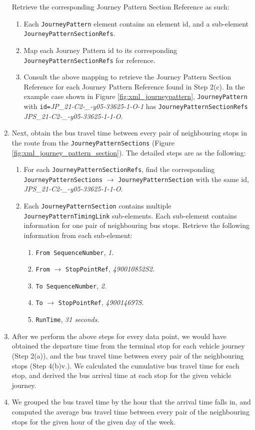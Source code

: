 \begin{enumerate}
  Retrieve the corresponding Journey Pattern Section Reference as such:
    \begin{enumerate}
      \item Each \texttt{JourneyPattern} element contains an element id, and a sub-element \texttt{JourneyPatternSectionRefs}.
      \item Map each Journey Pattern id to its corresponding \\ \texttt{JourneyPatternSectionRefs} for reference.
      \item Consult the above mapping to retrieve the Journey Pattern Section Reference for each Journey Pattern Reference found in Step 2(c). In the example case shown in Figure \ref{fig:xml_journeypattern}, \texttt{JourneyPattern} with \texttt{id=}\textit{JP\_21-C2-\_-y05-33625-1-O-1} has \texttt{JourneyPatternSectionRefs} \textit{JPS\_21-C2-\_-y05-33625-1-1-O}.
    \end{enumerate}
    \item Next, obtain the bus travel time between every pair of neighbouring stops in the route from the \texttt{JourneyPatternSections} (Figure \ref{fig:xml_journey_pattern_section}). The detailed steps are as the following:
    \begin{enumerate}
      \item For each \texttt{JourneyPatternSectionRefs}, find the corresponding \texttt{JourneyPatternSections} $\rightarrow$ \texttt{JourneyPatternSection} with the same id, \textit{JPS\_21-C2-\_-y05-33625-1-1-O}.
      \item Each \texttt{JourneyPatternSection} contains multiple \\ \texttt{JourneyPatternTimingLink} sub-elements. Each sub-element contains information for one pair of neighbouring bus stops. Retrieve the following information from each sub-element:
      \begin{enumerate}
        \item \texttt{From SequenceNumber}, \textit{1}.
        \item \texttt{From} $\rightarrow$ \texttt{StopPointRef}, \textit{490010852S2}.
        \item \texttt{To SequenceNumber}, \textit{2}.
        \item \texttt{To} $\rightarrow$ \texttt{StopPointRef}, \textit{490014697S}.
        \item \texttt{RunTime}, \textit{31 seconds}.
      \end{enumerate}
    \end{enumerate}
    \item After we perform the above steps for every data point, we would have obtained the departure time from the terminal stop  for each vehicle journey (Step 2(a)), and the bus travel time between every pair of the neighbouring stops (Step 4(b)v.). We calculated the cumulative bus travel time for each stop, and derived the bus arrival time at each stop for the given vehicle journey.
    \item We grouped the bus travel time by the hour that the arrival time falls in, and computed the average bus travel time between every pair of the neighbouring stops for the given hour of the given day of the week.



\end{enumerate}
